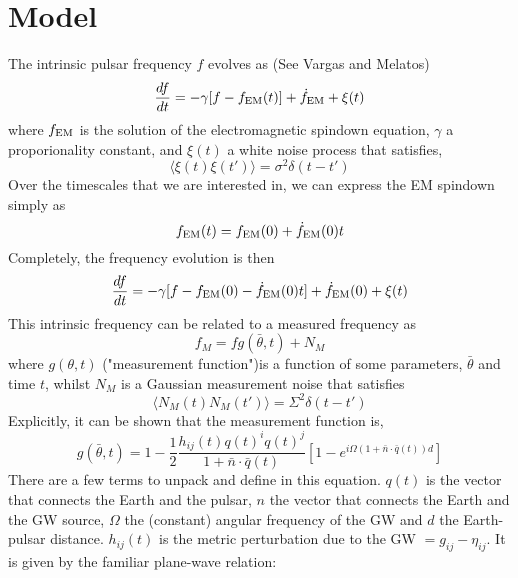 \documentclass[fleqn,usenatbib,useAMS]{mnras}
\begin{document}
\section{Model}
The intrinsic pulsar frequency $f$ evolves as (See Vargas and Melatos)
\begin{equation}
	\frac{df}{dt} = -\gamma	 [f - f_{\rm EM} (t)] + \dot{f}_{\rm EM} + \xi(t)
	\label{eq:frequency_evolution}
\end{equation}
where $f_{\rm EM}$ is the solution of the electromagnetic spindown equation, $\gamma$ a proporionality constant, and $\xi(t)$ a white noise process that satisfies,
\begin{equation}
	\langle \xi(t) \xi(t') \rangle = \sigma^2 \delta(t - t')
\end{equation}
Over the timescales that we are interested in, we can express the EM spindown simply as
\begin{equation}
	f_{\rm EM} (t) = f_{\rm EM}(0) + \dot{f}_{\rm EM} (0)t
\end{equation}  
Completely, the frequency evolution is then
\begin{equation}
	\frac{df}{dt} = -\gamma	 [f - f_{\rm EM}(0) - \dot{f}_{\rm EM} (0)t] + \dot{f}_{\rm EM} (0) + \xi(t)
	\label{eq:frequency_evolution_expanded}
\end{equation}
This intrinsic frequency can be related to a measured frequency as 
\begin{equation}
	f_M = f g(\bar{\theta},t) + N_M
\end{equation}
where $g(\theta,t)$ ("measurement function")is a function of some parameters, $\bar{\theta}$ and time $t$, whilst $N_M$ is a Gaussian measurement noise that satisfies 
\begin{equation}
	\langle N_M(t) N_M(t') \rangle = \Sigma^2 \delta(t - t')
\end{equation}
Explicitly, it can be shown that the measurement function is,
\begin{equation} \label{eq:final}
	g(\bar{\theta},t) = 1 - \frac{1}{2} \frac{h_{ij}(t) q(t)^i q(t)^j}{1 + \bar{n} \cdot \bar{q}(t)}[1 - e^{i \Omega(1+\bar{n} \cdot \bar{q}(t)) d}]
\end{equation}
There are a few terms to unpack and define in this equation. $q(t)$ is the vector that connects the Earth and the pulsar, $n$ the vector that connects the Earth and the GW source, $\Omega$ the (constant) angular frequency of the GW and $d$ the Earth-pulsar distance. $h_{ij}(t)$ is the metric perturbation due to the GW $= g_{ij} - \eta_{ij}$. It is given by the familiar plane-wave relation:	
\end{document}
